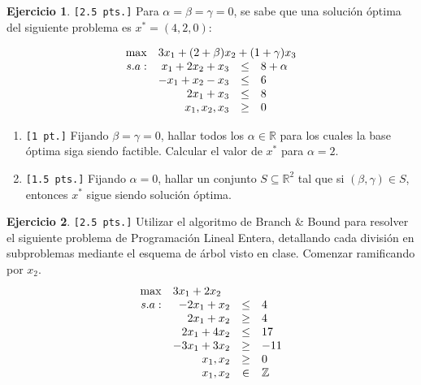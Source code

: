 \documentclass[a4paper,oneside,11pt]{amsart}
\theoremstyle{definition}
\newtheorem{quest}{Ejercicio}
\begin{document}
\begin{quest} \verb|[2.5 pts.]| Para $\alpha=\beta=\gamma=0$, se sabe que una solución óptima del siguiente problema es $x^\ast = (4,2,0)$:

\[
\begin{array}{rrcl}
\max & \multicolumn{3}{l}{3x_1+(2+\beta)x_2+(1+\gamma)x_3} \\
s.a: & x_1+2x_2+x_3 & \leq & 8+\alpha \\
 & -x_1+x_2-x_3 & \leq & 6 \\
 & 2x_1+x_3 & \leq & 8 \\
 & x_1, x_2, x_3 & \geq & 0
\end{array}
\]

    \begin{enumerate}[label=\alph*)]
    \item \verb|[1 pt.]| Fijando $\beta=\gamma=0$, hallar todos los $\alpha\in\mathbb{R}$ para los cuales la base óptima siga siendo factible. Calcular el valor de $x^\ast$ para $\alpha=2$. 
    \item \verb|[1.5 pts.]| Fijando $\alpha=0$, hallar un conjunto $S\subseteq \mathbb{R}^2$ tal que si $(\beta,\gamma)\in S$, entonces $x^\ast$ sigue siendo solución óptima.
    \end{enumerate}

\end{quest}




\begin{quest} \verb|[2.5 pts.]| Utilizar el algoritmo de Branch \& Bound para resolver el siguiente problema de Programación Lineal Entera, detallando cada división en subproblemas mediante el esquema de árbol visto en clase. Comenzar ramificando por $x_2$.
\[
\begin{array}{rrcl}
\max & \multicolumn{3}{l}{3x_1+2x_2} \\
s.a: & -2x_1+x_2 & \leq & 4 \\
 & 2x_1+x_2 & \geq & 4 \\
 & 2x_1+4x_2 & \leq & 17 \\
 & -3x_1+3x_2 & \geq & -11 \\
 & x_1, x_2 & \geq & 0 \\
 & x_1, x_2 & \in & \mathbb{Z}
\end{array}
\]
\end{quest}

\end{document}
